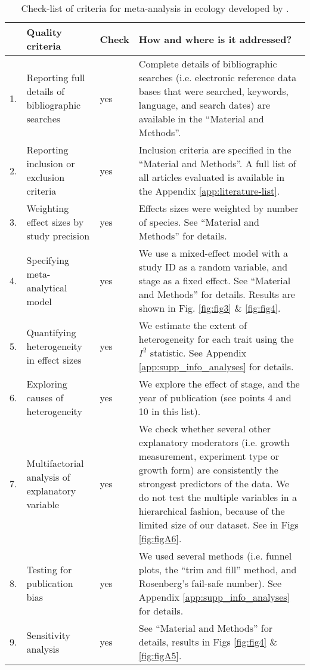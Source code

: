 \documentclass[a4paper,11pt]{article}
\begin{document}
\clearpage
\begin{table}[h!]
\centering
\caption{Check-list of criteria for meta-analysis in ecology developed by \citet{Koricheva:2014ku}.}
{\footnotesize
\vspace{0.5cm}
\begin{tabular}{p{0.2cm}p{4cm}p{0.8cm}p{7cm}}
  \hline
  & Quality criteria & Check & How and where is it addressed?\\
  \hline
  1.& Reporting full details of bibliographic searches & yes	& Complete details of bibliographic searches (i.e. electronic reference data bases that were searched, keywords, language, and search dates) are available in the ``Material and Methods''.\\
  2.& Reporting inclusion or exclusion criteria & yes & Inclusion criteria are specified in the ``Material and Methods''. A full list of all articles evaluated is available in the Appendix \ref{app:literature-list}.\\
  3.& Weighting effect sizes by study precision & yes & Effects sizes were weighted by number of species. See	``Material and Methods'' for details.\\
 4.& Specifying meta-analytical model &	yes	& We use a mixed-effect model with a study ID as a random variable, and stage as a fixed effect. See ``Material and Methods'' for details. Results are shown in Fig. \ref{fig:fig3} \& \ref{fig:fig4}.\\
 5.& Quantifying heterogeneity in effect sizes &	yes &	We estimate the extent of heterogeneity for each trait using the $I^{2}$ statistic. See Appendix \ref{app:supp_info_analyses} for details.\\
 6.& Exploring causes of heterogeneity & yes &	We explore the effect of stage, and the year of publication (see points 4 and 10 in this list).\\
 7.& Multifactorial analysis of explanatory variable	& yes & We check whether several other explanatory moderators (i.e. growth measurement, experiment type or growth form) are consistently the strongest predictors of the data. We do not test the multiple variables in a hierarchical fashion, because of the limited size of our dataset. See in Figs \ref{fig:figA6}.\\
  8.& Testing for publication bias &	yes	& We used several methods (i.e. funnel plots, the ``trim and fill'' method, and Rosenberg's fail-safe number). See Appendix \ref{app:supp_info_analyses} for details.\\
  9.& Sensitivity analysis &	yes &See ``Material and Methods'' for details, results in Figs \ref{fig:fig4} \& \ref{fig:figA5}.\\

\end{tabular}}
\end{table}
\end{document}
